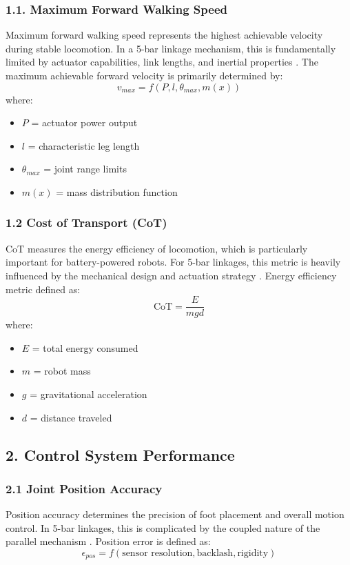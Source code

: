 \documentclass[12pt]{article}
\begin{document}
\subsubsection*{1.1. Maximum Forward Walking Speed}
Maximum forward walking speed represents the highest achievable velocity during stable locomotion. In a 5-bar linkage mechanism, this is fundamentally limited by actuator capabilities, link lengths, and inertial properties \cite{zhou2020}.
The maximum achievable forward velocity is primarily determined by:
\begin{equation}
    v_{max} = f(P, l, \theta_{max}, m(x))
\end{equation}
where:
\begin{itemize}
    \item $P$ = actuator power output
    \item $l$ = characteristic leg length
    \item $\theta_{max}$ = joint range limits
    \item $m(x)$ = mass distribution function
\end{itemize}

\subsubsection*{1.2 Cost of Transport (CoT)}
CoT measures the energy efficiency of locomotion, which is particularly important for battery-powered robots. For 5-bar linkages, this metric is heavily influenced by the mechanical design and actuation strategy \cite{rezazadeh2018}. Energy efficiency metric defined as:
\begin{equation}
    \text{CoT} = \frac{E}{mgd}
\end{equation}
where:
\begin{itemize}
    \item $E$ = total energy consumed
    \item $m$ = robot mass
    \item $g$ = gravitational acceleration
    \item $d$ = distance traveled
\end{itemize}

\subsection*{2. Control System Performance}
\subsubsection*{2.1 Joint Position Accuracy}
Position accuracy determines the precision of foot placement and overall motion control. In 5-bar linkages, this is complicated by the coupled nature of the parallel mechanism \cite{kuindersma2016}.
Position error is defined as:
\begin{equation}
    \epsilon_{pos} = f(\text{sensor resolution}, \text{backlash}, \text{rigidity})
\end{equation}
\end{document}
